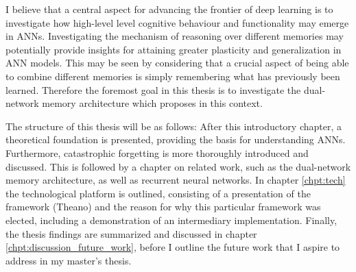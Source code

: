 I believe that a central aspect for advancing the frontier of deep learning is to investigate how high-level level cognitive behaviour and functionality may emerge in ANNs. Investigating the mechanism of reasoning over different memories may potentially provide insights for attaining greater plasticity and generalization in ANN models. This may be seen by considering that a crucial aspect of being able to combine different memories is simply remembering what has previously been learned. Therefore the foremost goal in this thesis is to investigate the dual-network memory architecture which \cite{Hattori2014} proposes in this context.

The structure of this thesis will be as follows: After this introductory chapter, a theoretical foundation is presented, providing the basis for understanding ANNs. Furthermore, catastrophic forgetting is more thoroughly introduced and discussed. This is followed by a chapter on related work, such as the dual-network memory architecture, as well as recurrent neural networks. In chapter \ref{chpt:tech} the technological platform is outlined, consisting of a presentation of the framework (Theano) and the reason for why this particular framework was elected, including a demonstration of an intermediary implementation. Finally, the thesis findings are summarized and discussed in chapter \ref{chpt:discussion_future_work}, before I outline the future work that I aspire to address in my master's thesis.


\cleardoublepage